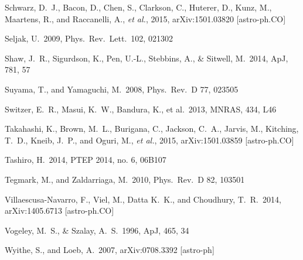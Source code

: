 \begin{thebibliography}{99}
\begin{multicols}{2}
{ 
  Schwarz, D.~J., Bacon, D., Chen, S., Clarkson, C., Huterer, D., Kunz, M., Maartens, R., and Raccanelli, A., {\it et al.}, 2015,
  arXiv:1501.03820 [astro-ph.CO]

  Seljak, U.\ 2009,
  Phys.\ Rev.\ Lett.\ 102, 021302

 Shaw, J.~R., Sigurdson, 
K., Pen, U.-L., Stebbins, A., \& Sitwell, M.\ 2014, ApJ, 781, 57 

  Suyama, T., and Yamaguchi, M.\ 2008,
  Phys.\ Rev.\ D 77, 023505

 Switzer, E.~R., Masui, 
K.~W., Bandura, K., et al.\ 2013, MNRAS, 434, L46 


  Takahashi, K., Brown, M.~L., Burigana, C., Jackson, C.~A., Jarvis, M., Kitching, T.~D., Kneib, J.~P., and Oguri, M., {\it et al.}, 2015,
  arXiv:1501.03859 [astro-ph.CO]

  Tashiro, H.\ 2014,
  PTEP 2014, no. 6, 06B107

  Tegmark, M., and Zaldarriaga, M.\ 2010,
  Phys.\ Rev.\ D 82, 103501



  Villaescusa-Navarro, F., Viel, M., Datta K.~K., and Choudhury, T.~R.\ 2014,
  arXiv:1405.6713 [astro-ph.CO]

 Vogeley, M.~S., \& Szalay, A.~S.\ 1996, ApJ, 465, 34 


  Wyithe, S., and Loeb, A.\ 2007,
  arXiv:0708.3392 [astro-ph]

}
\end{multicols}
\end{thebibliography}
